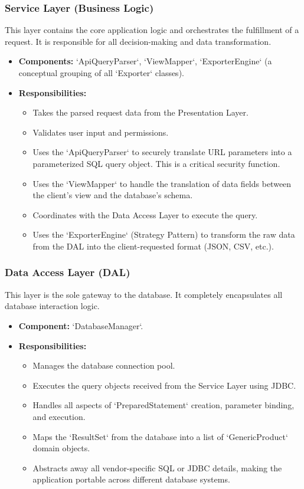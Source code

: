 \documentclass[12pt, a4paper]{report}
\begin{document}
\subsubsection{Service Layer (Business Logic)}
This layer contains the core application logic and orchestrates the fulfillment of a request. It is responsible for all decision-making and data transformation.
\begin{itemize}
    \item \textbf{Components:} `ApiQueryParser`, `ViewMapper`, `ExporterEngine` (a conceptual grouping of all `Exporter` classes).
    \item \textbf{Responsibilities:}
        \begin{itemize}
            \item Takes the parsed request data from the Presentation Layer.
            \item Validates user input and permissions.
            \item Uses the `ApiQueryParser` to securely translate URL parameters into a parameterized SQL query object. This is a critical security function.
            \item Uses the `ViewMapper` to handle the translation of data fields between the client's view and the database's schema.
            \item Coordinates with the Data Access Layer to execute the query.
            \item Uses the `ExporterEngine` (Strategy Pattern) to transform the raw data from the DAL into the client-requested format (JSON, CSV, etc.).
        \end{itemize}
\end{itemize}

\subsubsection{Data Access Layer (DAL)}
This layer is the sole gateway to the database. It completely encapsulates all database interaction logic.
\begin{itemize}
    \item \textbf{Component:} `DatabaseManager`.
    \item \textbf{Responsibilities:}
        \begin{itemize}
            \item Manages the database connection pool.
            \item Executes the query objects received from the Service Layer using JDBC.
            \item Handles all aspects of `PreparedStatement` creation, parameter binding, and execution.
            \item Maps the `ResultSet` from the database into a list of `GenericProduct` domain objects.
            \item Abstracts away all vendor-specific SQL or JDBC details, making the application portable across different database systems.
        \end{itemize}
\end{itemize}
\end{document}
